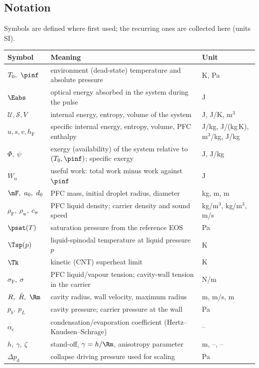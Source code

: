 \subsection{Notation}
Symbols are defined where first used; the recurring ones are collected here (units SI).
\begin{center}\small
\begin{longtable}{>{\raggedright}p{}p{}p{}}
\toprule Symbol & Meaning & Unit\\ \midrule\endhead
$T_0,\ \pinf$ & environment (dead-state) temperature and absolute pressure & K, Pa\\
$\Eabs$ & optical energy absorbed in the system during the pulse & J\\
$\mathcal U,\mathcal S,V$ & internal energy, entropy, volume of the system & J, J/K, m$^3$\\
$u,s,v,h_{\mathrm F}$ & specific internal energy, entropy, volume, PFC enthalpy & J/kg, J/(kg\,K), m$^3$/kg, J/kg\\
$\Phi,\ \psi$ & exergy (availability) of the system relative to $(T_0,\pinf)$; specific exergy & J, J/kg\\
$W_{\mathrm u}$ & useful work: total work minus work against $\pinf$ & J\\
$\mF,\ a_0,\ d_0$ & PFC mass, initial droplet radius, diameter & kg, m, m\\
$\rho_{\mathrm F},\ \rho_{\mathrm w},\ c_{\mathrm w}$ & PFC liquid density; carrier density and sound speed & kg/m$^3$, kg/m$^3$, m/s\\
$\psat(T)$ & saturation pressure from the reference EOS & Pa\\
$\Tsp(p)$ & liquid-spinodal temperature at liquid pressure $p$ & K\\
$\Tk$ & kinetic (CNT) superheat limit & K\\
$\sigma_{\mathrm F},\ \sigma$ & PFC liquid/vapour tension; cavity-wall tension in the carrier & N/m\\
$R,\ \dot R,\ \Rm$ & cavity radius, wall velocity, maximum radius & m, m/s, m\\
$p_b,\ p_L$ & cavity pressure; carrier pressure at the wall & Pa\\
$\alpha_{\mathrm c}$ & condensation/evaporation coefficient (Hertz--Knudsen--Schrage) & --\\
$h,\ \gamma,\ \zeta$ & stand-off, $\gamma=h/\Rm$, anisotropy parameter & m, --, --\\
$\Delta p_{\mathrm d}$ & collapse driving pressure used for scaling & Pa\\

\end{longtable}
\end{center}
